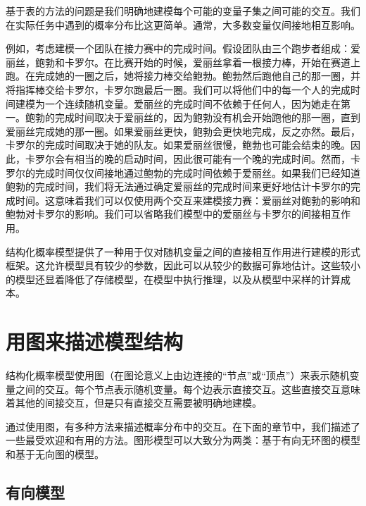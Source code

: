 基于表的方法的问题是我们明确地建模每个可能的变量子集之间可能的交互。我们在实际任务中遇到的概率分布比这更简单。通常，大多数变量仅间接地相互影响。

例如，考虑建模一个团队在接力赛中的完成时间。假设团队由三个跑步者组成：爱丽丝，鲍勃和卡罗尔。在比赛开始的时候，爱丽丝拿着一根接力棒，开始在赛道上跑。在完成她的一圈之后，她将接力棒交给鲍勃。鲍勃然后跑他自己的那一圈，并将指挥棒交给卡罗尔，卡罗尔跑最后一圈。我们可以将他们中的每一个人的完成时间建模为一个连续随机变量。爱丽丝的完成时间不依赖于任何人，因为她走在第一。鲍勃的完成时间取决于爱丽丝的，因为鲍勃没有机会开始跑他的那一圈，直到爱丽丝完成她的那一圈。如果爱丽丝更快，鲍勃会更快地完成，反之亦然。最后，卡罗尔的完成时间取决于她的队友。如果爱丽丝很慢，鲍勃也可能会结束的晚。因此，卡罗尔会有相当的晚的启动时间，因此很可能有一个晚的完成时间。然而，卡罗尔的完成时间仅仅间接地通过鲍勃的完成时间依赖于爱丽丝。如果我们已经知道鲍勃的完成时间，我们将无法通过确定爱丽丝的完成时间来更好地估计卡罗尔的完成时间。这意味着我们可以仅使用两个交互来建模接力赛：爱丽丝对鲍勃的影响和鲍勃对卡罗尔的影响。我们可以省略我们模型中的爱丽丝与卡罗尔的间接相互作用。

结构化概率模型提供了一种用于仅对随机变量之间的直接相互作用进行建模的形式框架。这允许模型具有较少的参数，因此可以从较少的数据可靠地估计。这些较小的模型还显着降低了存储模型，在模型中执行推理，以及从模型中采样的计算成本。

\section{用图来描述模型结构}
结构化概率模型使用图（在图论意义上由边连接的“节点”或“顶点”）来表示随机变量之间的交互。每个节点表示随机变量。每个边表示直接交互。这些直接交互意味着其他的间接交互，但是只有直接交互需要被明确地建模。

通过使用图，有多种方法来描述概率分布中的交互。在下面的章节中，我们描述了一些最受欢迎和有用的方法。图形模型可以大致分为两类：基于有向无环图的模型和基于无向图的模型。

\subsection{有向模型}




